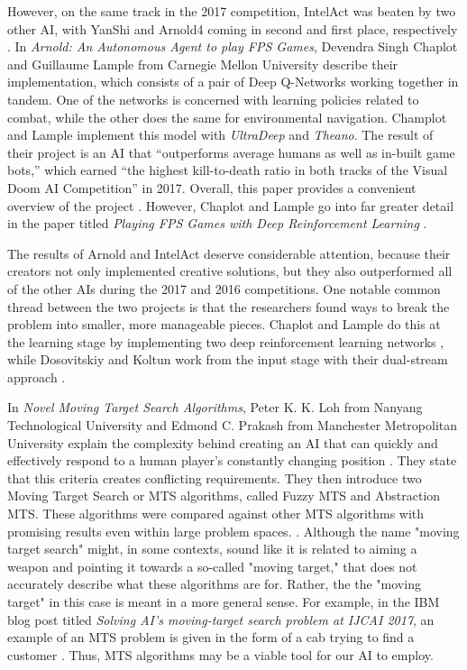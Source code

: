 However, on the same track in the 2017 competition, IntelAct was beaten by two other AI, with YanShi and Arnold4 coming in second and first place, respectively \cite{VDComp:2017}. In {\it Arnold: An Autonomous Agent to play FPS Games}, Devendra Singh Chaplot and Guillaume Lample from Carnegie Mellon University describe their implementation, which consists of a pair of Deep Q-Networks working together in tandem. One of the networks is concerned with learning policies related to combat, while the other does the same for environmental navigation. Champlot and Lample implement this model with {\it UltraDeep} and {\it Theano}. The result of their project is an AI that ``outperforms average humans as well as in-built game bots,'' which earned ``the highest kill-to-death ratio in both tracks of the Visual Doom AI Competition'' in 2017. Overall, this paper provides a convenient overview of the project \cite{Chaplot}. However, Chaplot and Lample go into far greater detail in the paper titled {\it Playing FPS Games with Deep Reinforcement Learning} \cite{Chaplot:2016}.

The results of Arnold and IntelAct deserve considerable attention, because their creators not only implemented creative solutions, but they also outperformed all of the other AIs during the 2017 and 2016 competitions. One notable common thread between the two projects is that the researchers found ways to break the problem into smaller, more manageable pieces. Chaplot and Lample do this at the learning stage by implementing two deep reinforcement learning networks \cite{Chaplot}, while Dosovitskiy and Koltun work from the input stage with their dual-stream approach \cite{Dosovitskiy:2016}.

In {\it Novel Moving Target Search Algorithms}, Peter K. K. Loh from Nanyang Technological University and Edmond C. Prakash from Manchester Metropolitan University explain the complexity behind creating an AI that can quickly and effectively respond to a human player's constantly changing position \cite{Loh:2009}. They state that this criteria creates conflicting requirements. They then introduce two Moving Target Search or MTS algorithms, called Fuzzy MTS and Abstraction MTS. These algorithms were compared against other MTS algorithms with promising results even within large problem spaces. \cite{Loh:2009}. Although the name "moving target search" might, in some contexts, sound like it is related to aiming a weapon and pointing it towards a so-called "moving target," that does not accurately describe what these algorithms are for. Rather, the the "moving target" in this case is meant in a more general sense. For example, in the IBM blog post titled {\it Solving AI’s moving-target search problem at IJCAI 2017}, an example of an MTS problem is given in the form of a cab trying to find a customer \cite{IBM:2017}. Thus, MTS algorithms may be a viable tool for our AI to employ.

